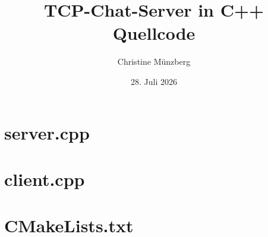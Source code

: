 \documentclass[a4paper,11pt]{article}
\title{TCP-Chat-Server in C++\\\large Quellcode}
\author{Christine Münzberg}
\date{28. Juli 2026}
\begin{document}
\maketitle
\thispagestyle{empty}

\tableofcontents
\newpage

\section{server.cpp}



\section{client.cpp}



\section{CMakeLists.txt}


\end{document}
